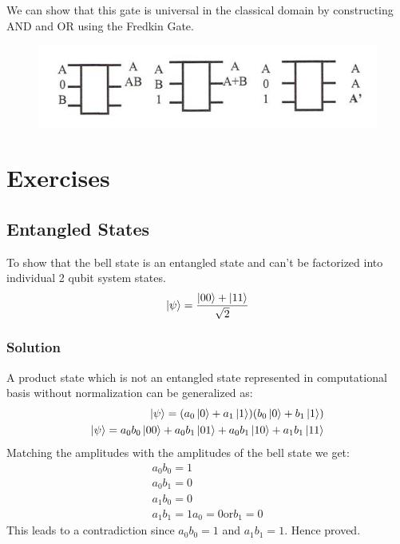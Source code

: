 \documentclass[11.5pt, paper=a4]{article}
\theoremstyle{definition}
\numberwithin{theorem}{section}
\begin{document}
We can show that this gate is universal in the classical domain by constructing AND and OR using the Fredkin Gate.

\begin{figure}[H]
    \centering
    \includegraphics[]{fredkin.jpg}
    \label{fig:my_label}
\end{figure}

\section*{Exercises}
\subsection{Entangled States}
To show that the bell state is an entangled state and can't be factorized into individual 2 qubit system states.
\begin{equation*}
    \ket{\psi} = \frac{\ket{00} + \ket{11}}{\sqrt{2}}
\end{equation*}
\subsubsection{Solution}
A product state which is not an entangled state represented in computational basis without normalization can be generalized as:
\begin{align*}
    \ket{\psi} = (a_0 \ket{0} + a_1 \ket{1})(b_0\ket{0} + b_1\ket{1}) \\
    \ket{\psi} = a_0 b_0\ket{00} + a_0 b_1\ket{01} + a_0 b_1\ket{10} + a_1 b_1\ket{11}
\end{align*}
Matching the amplitudes with the amplitudes of the bell state we get:
\begin{align*}
    a_0b_0 = 1 \\ a_0b_1 = 0 \\ a_1b_0 = 0 \\ a_1b_1 = 1
    a_0 = 0 \text{or} b_1 = 0
\end{align*}
This leads to a contradiction since $a_0b_0 = 1$ and $a_1b_1 = 1$. Hence proved.

\nocite{*}


\end{document}
